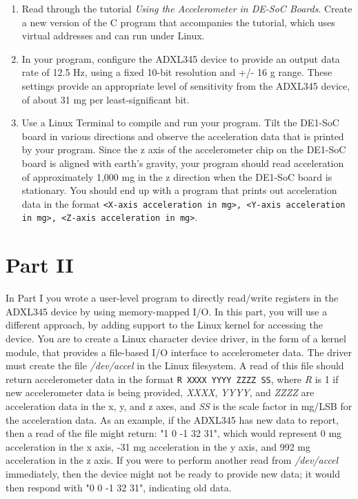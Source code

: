 \documentclass[epsfig,10pt,fullpage]{article}
\begin{document}
\begin{enumerate}
\item Read through the tutorial {\it Using the Accelerometer in DE-SoC Boards}. Create a new
version of the C program that accompanies the tutorial, which uses virtual addresses and
can run under Linux.
\item In your program, configure the ADXL345 device to provide an output data rate of 12.5
Hz, using a fixed 10-bit resolution and +/- 16 g range. These settings provide an appropriate
level of sensitivity from the ADXL345 device, of about 31 mg per least-significant bit.
\item Use a Linux Terminal to compile and run your program. Tilt the DE1-SoC board in various
directions and observe the acceleration data that is printed by your program. Since the z axis
of the accelerometer chip on the DE1-SoC board is aligned with earth's gravity, your program
should read acceleration of approximately 1,000 mg in the z direction when the DE1-SoC board
is stationary. You should end up with a program that prints out acceleration data in the format 
\texttt{<X-axis acceleration in mg>, <Y-axis acceleration in mg>, <Z-axis acceleration in mg>}.
\end{enumerate}

\noindent
\section*{Part II}

\noindent
In Part I you wrote a user-level program to directly read/write registers in the ADXL345
device by using memory-mapped I/O. In this part, you will use a different approach, by
adding support to the Linux kernel for accessing the device.
You are to create a Linux character device driver, in the form of a kernel
module, that provides a file-based I/O interface to accelerometer data. The driver must create
the file {\it /dev/accel} in the Linux filesystem. A read of this file should return accelerometer
data in the format \texttt{R XXXX YYYY ZZZZ SS}, where {\it R} is 1 if new accelerometer data
is being provided, {\it XXXX}, {\it YYYY}, and {\it ZZZZ} are acceleration data in the 
x, y, and z axes, and {\it SS} is the scale factor in mg/LSB for the acceleration data. As
an example, if the ADXL345 has new data to report, then a read of the file might return:
"1 0 -1 32 31", which would represent 0 mg acceleration in the x axis, -31 mg acceleration in
the y axis, and 992 mg acceleration in the z axis. If you were to perform another read from {\it
/dev/accel} immediately, then the device might not be ready to provide new data; it would
then respond with "0 0 -1 32 31", indicating old data.
\end{document}
